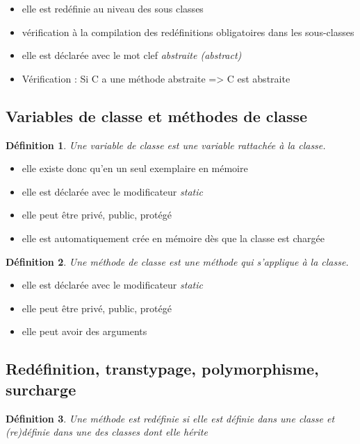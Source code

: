 \documentclass{article}
\newtheorem{definition}{Définition}
\begin{document}
\begin{itemize}
	\item elle est redéfinie au niveau des sous classes
	\item vérification à la compilation des redéfinitions obligatoires dans les
	sous-classes
	\item elle est déclarée avec le mot clef \emph{abstraite (abstract)}
	\item Vérification : Si C a une méthode abstraite => C est abstraite
\end{itemize}

\subsection{Variables de classe et méthodes de classe}

\begin{definition}
	Une variable de classe est une variable rattachée à la classe.
\end{definition}

\begin{itemize}
	\item elle existe donc qu'en un seul exemplaire en mémoire
	\item elle est déclarée avec le modificateur \emph{static}
	\item elle peut être privé, public, protégé
	\item elle est automatiquement crée en mémoire dès que la classe est chargée
\end{itemize}

\begin{definition}
	Une méthode de classe est une méthode qui s'applique à la classe.
\end{definition}

\begin{itemize}
	\item elle est déclarée avec le modificateur \emph{static}
	\item elle peut être privé, public, protégé
	\item elle peut avoir des arguments
\end{itemize}

\subsection{Redéfinition, transtypage, polymorphisme, surcharge}

\begin{definition}
	Une méthode est redéfinie si elle est définie dans une classe et
(re)définie dans une des classes dont elle hérite
\end{definition}
\end{document}
